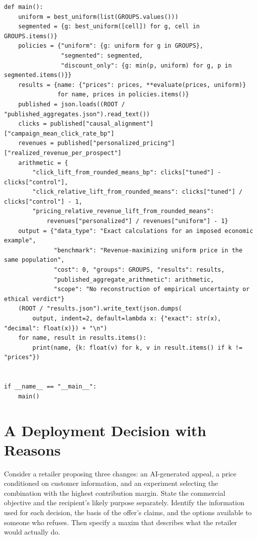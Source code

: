 \begin{Verbatim}[breaklines,breakanywhere,fontsize=\small]
def main():
    uniform = best_uniform(list(GROUPS.values()))
    segmented = {g: best_uniform([cell]) for g, cell in GROUPS.items()}
    policies = {"uniform": {g: uniform for g in GROUPS},
                "segmented": segmented,
                "discount_only": {g: min(p, uniform) for g, p in segmented.items()}}
    results = {name: {"prices": prices, **evaluate(prices, uniform)}
               for name, prices in policies.items()}
    published = json.loads((ROOT / "published_aggregates.json").read_text())
    clicks = published["causal_alignment"]["campaign_mean_click_rate_bp"]
    revenues = published["personalized_pricing"]["realized_revenue_per_prospect"]
    arithmetic = {
        "click_lift_from_rounded_means_bp": clicks["tuned"] - clicks["control"],
        "click_relative_lift_from_rounded_means": clicks["tuned"] / clicks["control"] - 1,
        "pricing_relative_revenue_lift_from_rounded_means":
            revenues["personalized"] / revenues["uniform"] - 1}
    output = {"data_type": "Exact calculations for an imposed economic example",
              "benchmark": "Revenue-maximizing uniform price in the same population",
              "cost": 0, "groups": GROUPS, "results": results,
              "published_aggregate_arithmetic": arithmetic,
              "scope": "No reconstruction of empirical uncertainty or ethical verdict"}
    (ROOT / "results.json").write_text(json.dumps(
        output, indent=2, default=lambda x: {"exact": str(x), "decimal": float(x)}) + "\n")
    for name, result in results.items():
        print(name, {k: float(v) for k, v in result.items() if k != "prices"})


if __name__ == "__main__":
    main()
\end{Verbatim}


\hypertarget{M09-a-deployment-decision-with-reasons}{%
\section{A Deployment Decision with
Reasons}\label{M09-a-deployment-decision-with-reasons}}

\noindent Consider a retailer proposing three changes: an AI-generated appeal, a
price conditioned on customer information, and an experiment selecting
the combination with the highest contribution margin. State the
commercial objective and the recipient's likely purpose separately.
Identify the information used for each decision, the basis of the
offer's claims, and the options available to someone who refuses. Then
specify a maxim that describes what the retailer would actually do.

